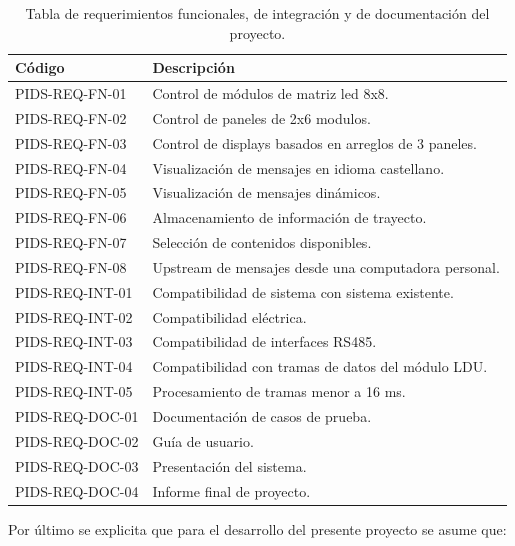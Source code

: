 \begin{table}[htb]
\caption{Tabla de requerimientos funcionales, de integración y de documentación del proyecto.}
\label{tab:Reqs}
\begin{tabular}{|l|l|}
\hline
\textbf{Código} & \textbf{Descripción}                                 \\ \hline
PIDS-REQ-FN-01  & Control de módulos de matriz led 8x8.                 \\ \hline
PIDS-REQ-FN-02  & Control de paneles de 2x6 modulos.                    \\ \hline
PIDS-REQ-FN-03  & Control de displays basados en arreglos de 3 paneles. \\ \hline
PIDS-REQ-FN-04  & Visualización de mensajes en idioma castellano.       \\ \hline
PIDS-REQ-FN-05  & Visualización de mensajes dinámicos.                  \\ \hline
PIDS-REQ-FN-06  & Almacenamiento de información de trayecto.            \\ \hline
PIDS-REQ-FN-07  & Selección de contenidos disponibles.                  \\ \hline
PIDS-REQ-FN-08  & Upstream de mensajes desde una computadora personal.  \\ \hline
PIDS-REQ-INT-01 & Compatibilidad de sistema con sistema existente.      \\ \hline
PIDS-REQ-INT-02 & Compatibilidad eléctrica.                             \\ \hline
PIDS-REQ-INT-03 & Compatibilidad de interfaces RS485.                   \\ \hline
PIDS-REQ-INT-04 & Compatibilidad con tramas de datos del módulo LDU.    \\ \hline
PIDS-REQ-INT-05 & Procesamiento de tramas menor a 16 ms.                \\ \hline
PIDS-REQ-DOC-01 & Documentación de casos de prueba.                     \\ \hline
PIDS-REQ-DOC-02 & Guía de usuario.                                      \\ \hline
PIDS-REQ-DOC-03 & Presentación del sistema.                             \\ \hline
PIDS-REQ-DOC-04 & Informe final de proyecto.                            \\ \hline
\end{tabular}
\end{table}


Por último se explicita que para el desarrollo del presente proyecto se asume que:

